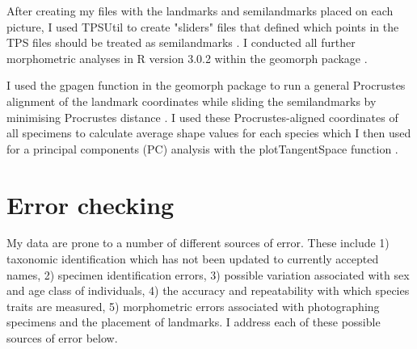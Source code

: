 	After creating my files with the landmarks and semilandmarks placed on each picture, I used TPSUtil \citep{Rohlf2012} to create "sliders" files that defined which points in the TPS files should be treated as semilandmarks \citep{Zelditch2012}. I conducted all further morphometric analyses in R version 3.0.2 \citep{Team2014} within the geomorph package \citep{Adams2013}.
	
	
	I used the gpagen function in the geomorph package \citep{Adams2013} to run a general Procrustes alignment \citep{Rohlf1993} of the landmark coordinates while sliding the semilandmarks by minimising Procrustes distance \citep{Bookstein1997}.
	I used these Procrustes-aligned coordinates of all specimens to calculate average shape values for each species which I then used for a principal components (PC) analysis with the plotTangentSpace function \citep{Adams2013}. 
	




\section{Error checking}
\label{sect:errors}
	My data are prone to a number of different sources of error. These include 1) taxonomic identification which has not been updated to currently accepted names, 2) specimen identification errors, 3) possible variation associated with sex and age class of individuals, 4) the accuracy and repeatability with which species traits are measured, 5) morphometric errors associated with photographing specimens and the placement of landmarks. I address each of these possible sources of error below.  

